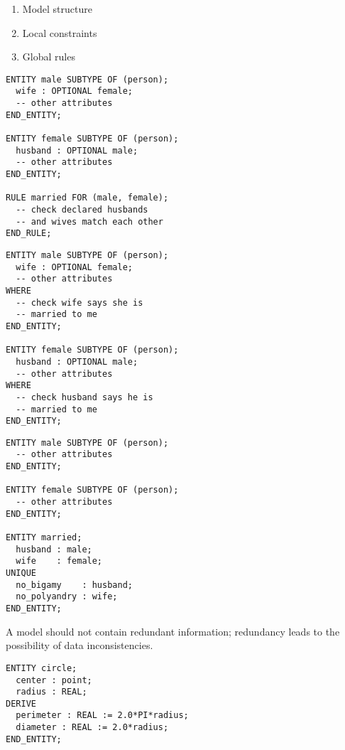 \begin{enumerate}
\item Model structure
\item Local constraints
\item Global rules
\end{enumerate}


\begin{verbatim}
ENTITY male SUBTYPE OF (person);
  wife : OPTIONAL female;
  -- other attributes
END_ENTITY;

ENTITY female SUBTYPE OF (person);
  husband : OPTIONAL male;
  -- other attributes
END_ENTITY;

RULE married FOR (male, female);
  -- check declared husbands
  -- and wives match each other
END_RULE;
\end{verbatim}



\begin{verbatim}
ENTITY male SUBTYPE OF (person);
  wife : OPTIONAL female;
  -- other attributes
WHERE
  -- check wife says she is
  -- married to me
END_ENTITY;

ENTITY female SUBTYPE OF (person);
  husband : OPTIONAL male;
  -- other attributes
WHERE
  -- check husband says he is
  -- married to me
END_ENTITY;
\end{verbatim}



\begin{verbatim}
ENTITY male SUBTYPE OF (person);
  -- other attributes
END_ENTITY;

ENTITY female SUBTYPE OF (person);
  -- other attributes
END_ENTITY;

ENTITY married;
  husband : male;
  wife    : female;
UNIQUE
  no_bigamy    : husband;
  no_polyandry : wife;
END_ENTITY;
\end{verbatim}


    A model should not contain redundant information; redundancy leads to
the possibility of data inconsistencies.

\begin{verbatim}
ENTITY circle;
  center : point;
  radius : REAL;
DERIVE
  perimeter : REAL := 2.0*PI*radius;
  diameter : REAL := 2.0*radius;
END_ENTITY;
\end{verbatim}


